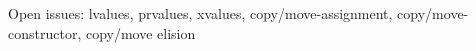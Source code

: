 \documentclass[9pt]{beamer}
\begin{document}
\begin{frame}[fragile]{Open issues: lvalues, prvalues, xvalues, copy/move-assignment, copy/move-constructor, copy/move elision}
\begin{itemize}



\end{itemize}
\end{frame}
\end{document}
